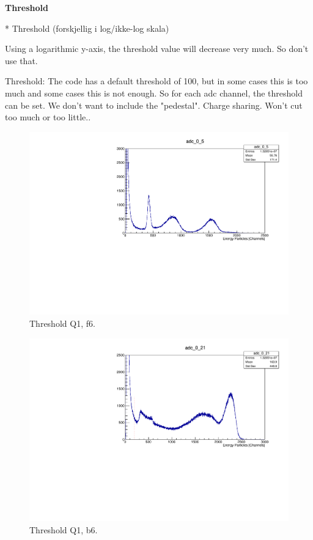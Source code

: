 \documentclass[twoside,english]{uiofysmaster/uiofysmaster}
\begin{document}
\textbf{Threshold}

* Threshold (forskjellig i log/ikke-log skala)

Using a logarithmic y-axis, the threshold value will decrease very much. So don't use that. 

Threshold: The code has a default threshold of 100, but in some cases this is too much and some cases this is not enough. So for each adc channel, the threshold can be set. We don't want to include the "pedestal". Charge sharing.
Won't cut too much or too little..

\begin{figure}[ht]
	\centering
	\includegraphics[width=\textwidth]{../Plots/plotting/Threshold_Q1_f6.pdf}
	\caption{Threshold Q1, f6.}
	\label{fig:Threshold_f}
\end{figure}

\begin{figure}[ht]
	\centering
	\includegraphics[width=\textwidth]{../Plots/plotting/Threshold_Q1_b6.pdf}
	\caption{Threshold Q1, b6.}
	\label{fig:Threshold_b}
\end{figure}
\end{document}
